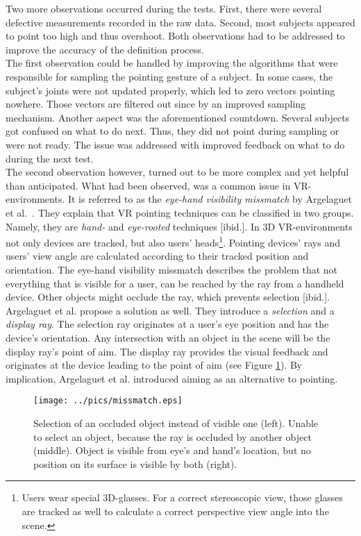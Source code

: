 Two more observations occurred during the tests. First, there were several defective measurements recorded in the raw data. Second, most subjects appeared to point too high and thus overshoot. Both observations had to be addressed to improve the accuracy of the definition process.
\\
The first observation could be handled by improving the algorithms that were responsible for sampling the pointing gesture of a subject. In some cases, the subject's joints were not updated properly, which led to zero vectors pointing nowhere. Those vectors are filtered out since by an improved sampling mechanism. Another aspect was the aforementioned countdown. Several subjects got confused on what to do next. Thus, they did not point during sampling or were not ready. The issue was addressed with improved feedback on what to do during the next test.
\\
The second observation however, turned out to be more complex and yet helpful than anticipated. What had been observed, was a common issue in \ac{VR}-environments. It is referred to as the \textit{eye-hand visibility missmatch} by Argelaguet et al.~\cite{EyeHandMissmatchVR}. They explain that \ac{VR} pointing techniques can be classified in two groups. Namely, they are \textit{hand-} and \textit{eye-rooted} techniques [ibid.]. In \ac{3D} \ac{VR}-environments not only devices are tracked, but also users' heads\footnote{Users wear special \ac{3D}-glasses. For a correct stereoscopic view, those glasses are tracked as well to calculate a correct perspective view angle into the scene.}. Pointing devices' rays and users' view angle are calculated according to their tracked position and orientation. The eye-hand visibility missmatch describes the problem that not everything that is visible for a user, can be reached by the ray from a handheld device. Other objects might occlude the ray, which prevents selection [ibid.]. Argelaguet et al. propose a solution as well. They introduce a \textit{selection} and a \textit{display ray}. The selection ray originates at a user's eye position and has the device's orientation. Any intersection with an object in the scene will be the display ray's point of aim. The display ray provides the visual feedback and originates at the device leading to the point of aim (see Figure \ref{fig:miss_match}). By implication, Argelaguet et al. introduced aiming as an alternative to pointing. 
\begin{figure}[H]%
\texttt{[image: ../pics/missmatch.eps]}%
\caption{Selection of an occluded object instead of visible one (left). Unable to select an object, because the ray is occluded by another object (middle). Object is visible from eye's and hand's location, but no position on its surface is visible by both (right).~\cite{EyeHandMissmatchVR}}%
\label{fig:miss_match}%
\end{figure}

